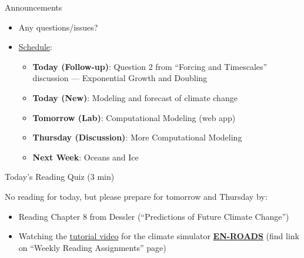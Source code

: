 \documentclass[12pt]{beamer}
\title%
{}
\subtitle
{} %
\author%
{Ben Holder}%
\date%
{}
\begin{document}

\begin{frame}{Announcements}
	\begin{itemize}
	\addtolength{\itemsep}{0.5\baselineskip}
	\item Any questions/issues?
	\item \underline{Schedule}:
		\begin{itemize}
		\item[]{\bf Today (Follow-up)}: Question 2 from ``Forcing and Timescales'' discussion --- Exponential Growth and Doubling
		\item[]{\bf Today (New)}: Modeling and forecast of climate change
		\item[]{\bf Tomorrow (Lab)}: Computational Modeling (web app)
		\item[]{\bf Thursday (Discussion)}: More Computational Modeling
		\item[] {\bf Next Week}: Oceans and Ice
		\end{itemize}
	\end{itemize}

\end{frame}
\begin{frame}{Today's Reading Quiz (3 min)}


%	
%
%
%
%


No reading for today, but please prepare for tomorrow and Thursday by:
	\begin{itemize}
	\item Reading Chapter 8 from Dessler (``Predictions of Future Climate Change'')
	\item Watching the \href{https://www.youtube.com/watch?v=4O-5fsVZaII}{tutorial video} for the climate simulator \href{https://en-roads.climateinteractive.org/}{{\bf EN-ROADS}} (find link on ``Weekly Reading Assignments'' page)
	\end{itemize}
	

\end{frame}
\end{document}
